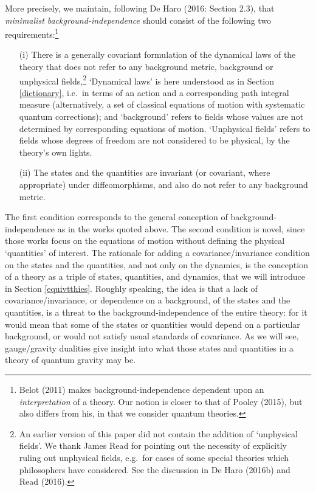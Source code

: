 \documentclass[12pt]{article}
\renewcommand{\^}[1]{\hat{#1}}
\begin{document}
More precisely, we maintain, following De Haro (2016: Section 2.3), that {\it minimalist background-independence} should consist of the following two requirements:\footnote{Belot (2011) makes background-independence dependent upon an {\it interpretation} of a theory. Our notion is closer to that of Pooley (2015), but also differs from his, in that we consider quantum theories.}
\begin{itemize}
\item[(i)] There is a generally covariant formulation of the dynamical laws of the theory that does not refer to any background metric, background or unphysical fields,\footnote{An earlier version of this paper did not contain the addition of `unphysical fields'. We thank James Read for pointing out the necessity of explicitly ruling out unphysical fields, e.g.~for cases of some special theories which philosophers have considered. See the discussion in De Haro (2016b) and Read (2016).} `Dynamical laws' is here understood as in Section \ref{dictionary}, i.e.~in terms of an action and a corresponding path integral measure (alternatively, a set of classical equations of motion with systematic quantum corrections); and `background' refers to fields whose values are not determined by corresponding equations of motion. `Unphysical fields' refers to fields whose degrees of freedom are not considered to be physical, by the theory's own lights.
\item[(ii)] The states and the quantities are invariant (or covariant, where appropriate) under diffeomorphisms, and also do not refer to any background metric.
\end{itemize}
The first condition corresponds to the general conception of background-independence as in the works quoted above. The second condition is novel, since those works focus on the equations of motion without defining the physical `quantities' of interest. The rationale for adding a covariance/invariance condition on the states and the quantities, and not only on the dynamics, is the conception of a theory as a triple of states, quantities, and dynamics, that we will introduce in Section \ref{equivtthies}. Roughly speaking, the idea is that a lack of covariance/invariance, or dependence on a background, of the states and the quantities, is a threat to the background-independence of the entire theory: for it would mean that some of the states or quantities would depend on a particular background, or would not satisfy usual standards of covariance. As we will see, gauge/gravity dualities give insight into what those states and quantities in a theory of quantum gravity may be.
\end{document}

